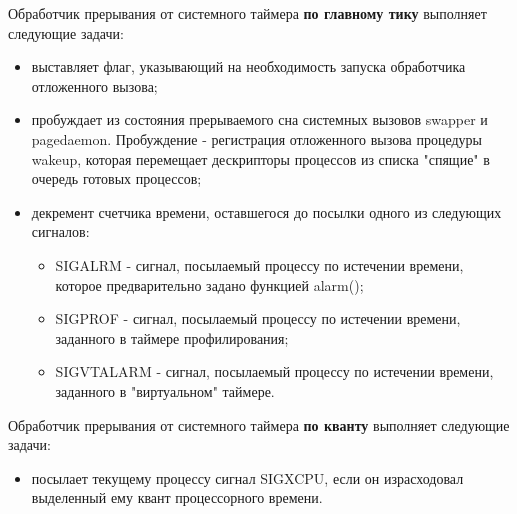 Обработчик прерывания от системного таймера \textbf{по главному тику} выполняет следующие задачи:
\begin{itemize}
	\item выставляет флаг, указывающий на необходимость запуска обработчика отложенного вызова;
	\item пробуждает из состояния прерываемого сна системных вызовов swapper и pagedaemon. Пробуждение - регистрация отложенного вызова процедуры wakeup, которая перемещает дескрипторы процессов из списка "спящие" в очередь готовых процессов;
	\item декремент счетчика времени, оставшегося до посылки одного из следующих сигналов:
	\begin{itemize}
		\item SIGALRM - сигнал, посылаемый процессу по истечении времени, которое предварительно задано функцией alarm();
		\item SIGPROF - сигнал, посылаемый процессу по истечении времени, заданного в таймере профилирования;
		\item SIGVTALARM - сигнал, посылаемый процессу по истечении времени, заданного в "виртуальном" таймере.
	\end{itemize}
\end{itemize}

Обработчик прерывания от системного таймера \textbf{по кванту} выполняет следующие задачи:
\begin{itemize}
	\item посылает текущему процессу сигнал SIGXCPU, если он израсходовал выделенный ему квант процессорного времени.
\end{itemize}